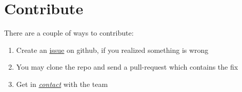 \chapter{Contribute}
\label{about/contribute:contribute}\label{about/contribute::doc}
There are a couple of ways to contribute:
\begin{enumerate}
\item Create an \href{https://github.com/tudifs/fvf/issues}{issue} on github, if you realized something is wrong
\item You may clone the repo and send a pull-request which contains the fix
\item Get in {\hyperref[about/authors::doc]{\emph{\emph{contact}}}} with the team
\end{enumerate}